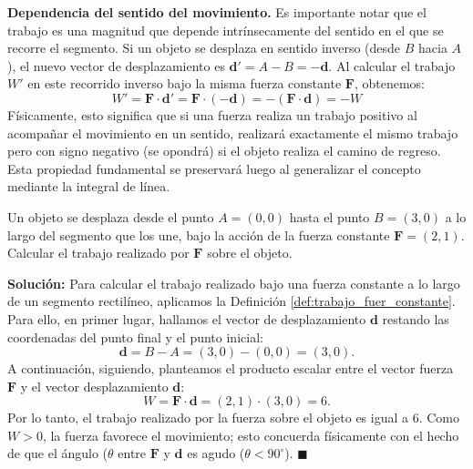 \begin{obs}
\textbf{Dependencia del sentido del movimiento.}
Es importante notar que el trabajo es una magnitud que depende intrínsecamente del sentido en el que se recorre el segmento. Si un objeto se desplaza en sentido inverso (desde $B$ hacia $A$), el nuevo vector de desplazamiento es $\mathbf{d}' = A - B = -\mathbf{d}$.  Al calcular el trabajo $W'$ en este recorrido inverso bajo la misma fuerza constante $\mathbf{F}$, obtenemos:
\[ W' = \mathbf{F} \cdot \mathbf{d}' = \mathbf{F} \cdot (-\mathbf{d}) = -(\mathbf{F} \cdot \mathbf{d}) = -W \]
Físicamente, esto significa que si una fuerza realiza un trabajo positivo al acompañar el movimiento en un sentido, realizará exactamente el mismo trabajo pero con signo negativo (se opondrá) si el objeto realiza el camino de regreso. Esta propiedad fundamental se preservará luego al generalizar el concepto mediante la integral de línea.
\end{obs}





\begin{example} 
Un objeto se desplaza desde el punto $A = (0, 0)$ hasta el punto $B = (3, 0)$ a lo largo del segmento que los une, bajo la acción de la fuerza constante $\mathbf{F} = (2, 1)$. Calcular el trabajo realizado por $\mathbf{F}$ sobre el objeto. 

\noindent\textbf{Solución:} Para calcular el trabajo realizado bajo una fuerza constante a lo largo de un segmento rectilíneo, aplicamos la Definición \ref{def:trabajo_fuer_constante}. 
Para ello, en primer lugar, hallamos el vector de desplazamiento $\mathbf{d}$ restando las coordenadas del punto final y el punto inicial:
\[ 
\mathbf{d} = B - A = (3, 0) - (0, 0) = (3, 0). 
\] 
A continuación, siguiendo,  planteamos el producto escalar entre el vector fuerza $\mathbf{F}$ y el vector desplazamiento $\mathbf{d}$:
$$
W = \mathbf{F} \cdot \mathbf{d} = (2, 1) \cdot (3, 0) = 6.
$$
Por lo tanto, el trabajo realizado por la fuerza sobre el objeto es igual a $6$. Como $W > 0$, la fuerza favorece el movimiento; esto concuerda físicamente con el hecho de que el ángulo ($\theta$ entre $\mathbf{F}$ y $\mathbf{d}$ es agudo ($\theta < 90^\circ$). \hfill $\blacksquare$
\end{example}









